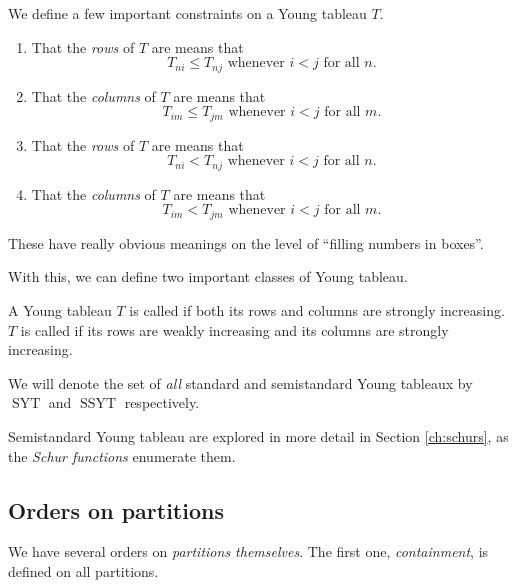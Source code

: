\documentclass{article}
\DeclareMathOperator{\SYT}{SYT}
\DeclareMathOperator{\SSYT}{SSYT}
\begin{document}
\begin{definition}
    We define a few important constraints on a Young tableau $T$.
    \begin{enumerate}[label=(\alph*)]
        \item That the \textit{rows} of $T$ are  means that
            \[
                T_{ni} \leq T_{nj} \text{ whenever } i < j \text{ for all }n.
            \]
        \item That the \textit{columns} of $T$ are  means that
            \[
                T_{im} \leq T_{jm} \text{ whenever } i < j \text{ for all }m.
            \]
        \item That the \textit{rows} of $T$ are  means that
            \[
                T_{ni} < T_{nj} \text{ whenever } i < j \text{ for all }n.
            \]
        \item That the \textit{columns} of $T$ are  means that
            \[
                T_{im} < T_{jm} \text{ whenever } i < j \text{ for all }m.
            \]
    \end{enumerate}
\end{definition} 

These have really obvious meanings on the level of ``filling numbers in boxes''.

With this, we can define two important classes of Young tableau.

\begin{definition}
    A Young tableau $T$ is called  if both its rows and columns are strongly increasing. $T$ is called  if its rows are weakly increasing and its columns are strongly increasing.

    We will denote the set of \textit{all} standard and semistandard Young tableaux by $\SYT$ and $\SSYT$ respectively.
\end{definition}

Semistandard Young tableau are explored in more detail in Section \ref{ch:schurs}, as the \textit{Schur functions} enumerate them.

\subsection{Orders on partitions}

We have several orders on \textit{partitions themselves}.
The first one, \textit{containment}, is defined on all partitions.
\end{document}
